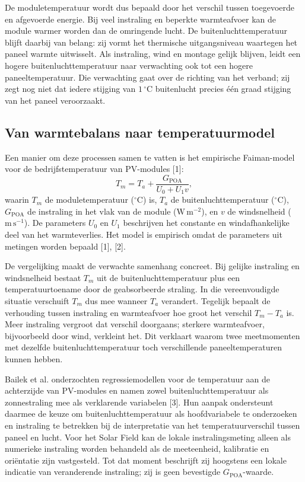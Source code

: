 \documentclass[12pt,a4paper]{article}
\begin{document}
De moduletemperatuur wordt dus bepaald door het verschil tussen toegevoerde en afgevoerde energie. Bij veel instraling en beperkte warmteafvoer kan de module warmer worden dan de omringende lucht. De buitenluchttemperatuur blijft daarbij van belang: zij vormt het thermische uitgangsniveau waartegen het paneel warmte uitwisselt. Als instraling, wind en montage gelijk blijven, leidt een hogere buitenluchttemperatuur naar verwachting ook tot een hogere paneeltemperatuur. Die verwachting gaat over de richting van het verband; zij zegt nog niet dat iedere stijging van \(1\,^\circ\mathrm{C}\) buitenlucht precies één graad stijging van het paneel veroorzaakt.

\subsection{Van warmtebalans naar temperatuurmodel}

Een manier om deze processen samen te vatten is het empirische Faiman-model voor de bedrijfstemperatuur van PV-modules [1]:
\begin{equation}
T_m=T_a+\frac{G_{\mathrm{POA}}}{U_0+U_1v},
\label{eq:faiman}
\end{equation}
waarin \(T_m\) de moduletemperatuur (\(^\circ\mathrm{C}\)) is, \(T_a\) de buitenluchttemperatuur (\(^\circ\mathrm{C}\)), \(G_{\mathrm{POA}}\) de instraling in het vlak van de module (\(\mathrm{W\,m^{-2}}\)), en \(v\) de windsnelheid (\(\mathrm{m\,s^{-1}}\)). De parameters \(U_0\) en \(U_1\) beschrijven het constante en windafhankelijke deel van het warmteverlies. Het model is empirisch omdat de parameters uit metingen worden bepaald [1], [2].

De vergelijking maakt de verwachte samenhang concreet. Bij gelijke instraling en windsnelheid bestaat \(T_m\) uit de buitenluchttemperatuur plus een temperatuurtoename door de geabsorbeerde straling. In die vereenvoudigde situatie verschuift \(T_m\) dus mee wanneer \(T_a\) verandert. Tegelijk bepaalt de verhouding tussen instraling en warmteafvoer hoe groot het verschil \(T_m-T_a\) is. Meer instraling vergroot dat verschil doorgaans; sterkere warmteafvoer, bijvoorbeeld door wind, verkleint het. Dit verklaart waarom twee meetmomenten met dezelfde buitenluchttemperatuur toch verschillende paneeltemperaturen kunnen hebben.

Bailek et al. onderzochten regressiemodellen voor de temperatuur aan de achterzijde van PV-modules en namen zowel buitenluchttemperatuur als zonnestraling mee als verklarende variabelen [3]. Hun aanpak ondersteunt daarmee de keuze om buitenluchttemperatuur als hoofdvariabele te onderzoeken en instraling te betrekken bij de interpretatie van het temperatuurverschil tussen paneel en lucht. Voor het Solar Field kan de lokale instralingsmeting alleen als numerieke instraling worden behandeld als de meeteenheid, kalibratie en oriëntatie zijn vastgesteld. Tot dat moment beschrijft zij hoogstens een lokale indicatie van veranderende instraling; zij is geen bevestigde \(G_{\mathrm{POA}}\)-waarde.
\end{document}
